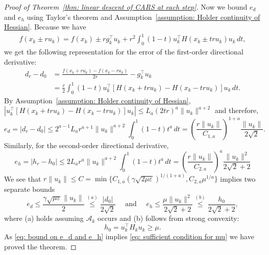 \begin{proof}[Proof of Theorem~\ref{thm: linear descent of CARS at each step}]
    Now we bound $e_d$ and $e_h$ using Taylor's theorem and Assumption~\ref{assumption: Holder continuity of Hessian}. Because we have
    \begin{align} \label{eq: finite difference with Taylor's theorem}
        f(x_k \pm r u_{k}) = f(x_k) \pm r g_k^{\top}u_{k} + r^2 \int_0^1 (1-t) u_{k}^{\top}H(x_k \pm tr u_{k})u_{k} \,dt,
    \end{align}
    we get the following representation for the error of the first-order directional derivative:
    \begin{align*}
        d_r - d_{0} & = \frac{f(x_k + r u_{k})-f(x_k - r u_{k})}{2r} - g_k^{\top}u_{k}                                        \\
                    & = \frac{r}{2}\int_0^{1} (1-t) u_{k}^{\top}\left[H(x_k + tr u_{k}) - H(x_k - tr u_{k})\right]u_{k} \,dt.
    \end{align*}
    By Assumption~\ref{assumption: Holder continuity of Hessian},
    $ \left|u_{k}^{\top} \left[H(x_k + tr u_{k}) - H(x_k - tr u_{k})\right] u_{k}\right| \leq L_a (2tr)^a\|u_{k}\|^{a+2} $
    and therefore,
    \begin{equation}\label{eq: d_mu - a bound}
        e_d = |d_r - d_{0}| \leq   2^{a-1} L_ar^{a+1} \|u_{k}\|^{a+2} \int_0^1 (1-t)t^a\,dt
        = \left(\frac{r\|u_k\|}{C_{1,a}}\right)^{1+a}\frac{\|u_k\|}{2\sqrt{2}}.
    \end{equation}
    Similarly, for the second-order directional derivative,
    \begin{equation} \label{eq: h_mu - b bound}
        e_h = |h_r - h_{0}| \leq  2 L_a r^{a} \|u_{k}\|^{a+2} \int_0^1 (1-t)t^a\,dt
        = \left(\frac{r\|u_k\|}{C_{2,a}}\right)^{a}\frac{\|u_k\|^2}{2\sqrt{2}+2}
    \end{equation}
    We see that $r\|u_k\| \leq C = \min\{C_{1,a}(\gamma \sqrt{2\mu \varepsilon})^{1/(1+a)}, C_{2,a}\mu^{1/a} \}$ implies two separate bounds
    \begin{equation}\label{eq: bound on e_d and e_h}
        e_d \leq \frac{\gamma\sqrt{\mu\varepsilon}\|u_k\|}{2} \stackrel{(a)}{\leq} \frac{|d_0|}{2\sqrt{2}} \quad \text{ and } \quad e_h \leq \frac{\mu\|u_k\|^2}{2\sqrt{2} + 2} \stackrel{(b)}{\leq} \frac{h_0}{2\sqrt{2}+2},
    \end{equation}
    where (a) holds assuming $\mathcal{A}_k$ occurs and (b) follows from strong convexity:
    \begin{equation}
        h_0 = u_k^{\top}H_k u_k \geq \mu.
    \end{equation}
    As \eqref{eq: bound on e_d and e_h} implies \eqref{eq: sufficient condition for mu} we have proved the theorem.
\end{proof}


